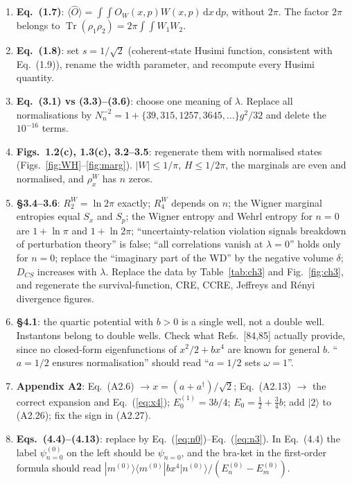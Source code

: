 \documentclass[11pt,a4paper]{article}
\newcommand{\Eq}[1]{Eq.~(#1)}
\newcommand{\ket}[1]{|#1\rangle}
\newcommand{\dd}{\mathrm{d}}
\begin{document}
\begin{enumerate}[label=\arabic*.,leftmargin=1.6em]
\item \textbf{\Eq{1.7}}: $\langle\hat O\rangle=\int\!\!\int O_W(x,p)W(x,p)\,\dd x\,\dd p$, without
  $2\pi$. The factor $2\pi$ belongs to $\operatorname{Tr}(\rho_1\rho_2)=2\pi\int\!\!\int W_1W_2$.
\item \textbf{\Eq{1.8}}: set $s=1/\sqrt2$ (coherent-state Husimi function, consistent with
  \Eq{1.9}), rename the width parameter, and recompute every Husimi quantity.
\item \textbf{Eq.~(3.1) vs (3.3)--(3.6)}: choose one meaning of $\lambda$. Replace all
  normalisations by $N_n^{-2}=1+\{39,315,1257,3645,\dots\}g^2/32$ and delete the $10^{-16}$
  terms.
\item \textbf{Figs.~1.2(c), 1.3(c), 3.2--3.5}: regenerate them with normalised states
  (Figs.~\ref{fig:WH}--\ref{fig:marg}). $|W|\le1/\pi$, $H\le1/2\pi$, the marginals are even and
  normalised, and $\rho^W_x$ has $n$ zeros.
\item \textbf{\S3.4--3.6}: $R^W_2=\ln2\pi$ exactly; $R^W_4$ depends on $n$; the Wigner
  marginal entropies equal $S_x$ and $S_p$; the Wigner entropy and Wehrl entropy for $n=0$
  are $1+\ln\pi$ and $1+\ln2\pi$; ``uncertainty-relation violation signals breakdown of
  perturbation theory'' is false; ``all correlations vanish at $\lambda=0$'' holds only for
  $n=0$; replace the ``imaginary part of the WD'' by the negative volume $\delta$;
  $D_{CS}$ increases with $\lambda$. Replace the data by Table~\ref{tab:ch3} and
  Fig.~\ref{fig:ch3}, and regenerate the survival-function, CRE, CCRE, Jeffreys and Rényi
  divergence figures.
\item \textbf{\S4.1}: the quartic potential with $b>0$ is a single well, not a double well.
  Instantons belong to double wells. Check what Refs.~[84,85] actually provide, since no
  closed-form eigenfunctions of $x^2/2+bx^4$ are known for general $b$. ``$a=1/2$ ensures
  normalisation'' should read ``$a=1/2$ sets $\omega=1$''.
\item \textbf{Appendix A2}: \Eq{A2.6} $\to x=(a+a^\dagger)/\sqrt2$; \Eq{A2.13} $\to$ the correct
  expansion and \Eq{\ref{eq:x4}}; $E_0^{(1)}=3b/4$; $E_0=\tfrac12+\tfrac34b$; add $\ket2$ to
  (A2.26); fix the sign in (A2.27).
\item \textbf{Eqs.~(4.4)--(4.13)}: replace by \Eq{\ref{eq:n0}}--\Eq{\ref{eq:n3}}. In \Eq{4.4} the
  label $\psi^{(0)}_{n=0}$ on the left should be $\psi_{n=0}$, and the bra-ket in the
  first-order formula should read $|m^{(0)}\rangle\langle m^{(0)}|bx^4|n^{(0)}\rangle/(E_n^{(0)}-E_m^{(0)})$.

\end{enumerate}
\end{document}
